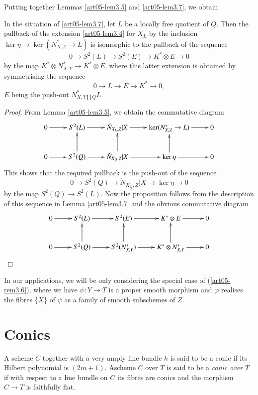 Putting together Lemmas \ref{art05-lem3.5} and \ref{art05-lem3.7}, we obtain

\begin{subprop}\label{art05-prop3.8}
In the situation of \ref{art05-lem3.7}, let $L$ be a locally free
quotient of $Q$. Then the pullback of the extension \ref{art05-lem3.4}
for $X_{L}$ by the inclusion $\ker \eta\to \ker (N^{*}_{X,Z}\to L)$ is
isomorphic to the pullback of the sequence
$$
0\to S^{2}(L)\to S^{2}(E)\to K^{*}\otimes E\to 0
$$
by the map $K^{*}\otimes N^{*}_{X,Y}\to K^{*}\otimes E$, where this
latter extension is obtained by symmetrising the sequence
$$
0\to L\to E\to K^{*}\to 0,
$$
$E$ being the push-out $N^{*}_{X,Y\coprod{Q}}L$.
\end{subprop}

\begin{proof}
From Lemma \ref{art05-lem3.5}, we obtain the commutative diagram
\[
\xymatrix{
0\ar[r] & S^{2}(L)\ar[r] & \check{N}_{X_{L},Z}|X\ar[r] & \ker
(N^{*}_{X,Z}\to L)\ar[r] & 0\\
0\ar[r] & S^{2}(Q)\ar[u]\ar[r] & \check{N}_{X_{Q},Z}|X\ar[r]\ar[u]
& \ker \eta\ar[r]\ar[u] & 0
}
\]
This shows that the required pullback is the push-out of the sequence
$$
0\to S^{2}(Q)\to \check{N}_{X_{Q},Z}|X\to \ker \eta\to 0
$$
by the map $S^{2}(Q)\to S^{2}(L)$. Now the proposition follows from
the description of this sequence in Lemma \ref{art05-lem3.7} and the
obvious commutative diagram
\[
\xymatrix{
0\ar[r] & S^{2}(L)\ar[r] & S^{2}(E)\ar[r] & K^{*}\otimes E\ar[r] & 0\\
0\ar[r] & S^{2}(Q)\ar[r]\ar[u] & S^{2}(N^{*}_{X,Y})\ar[r]\ar[u] &
K^{*}\otimes N^{*}_{X,Y}\ar[r]\ar[u] & 0
}
\]
\end{proof}

\begin{subremark}\label{art05-rem3.9}
In our applications, we will be only considering the special case of
(\ref{art05-rem3.6}), where we have $\psi:Y\to T$ is a proper smooth
morphism and $\varphi$ realises the fibres $\{X\}$ of $\psi$ as a
family of smooth subschemes of $Z$.
\end{subremark}

\section{Conics}\label{art05-sec4}

\begin{definition}\label{art05-defi4.1}
A scheme $C$ together with a very amply line bundle $h$ is said to be
a conic if its Hilbert polynomial is $(2m+1)$. A\pageoriginale scheme
$C$ over $T$ is said to be a {\em conic over} $T$ if with respect to a line
bundle on $C$ its fibres are conics and the morphism $C\to T$ is
faithfully flat. 
\end{definition}

